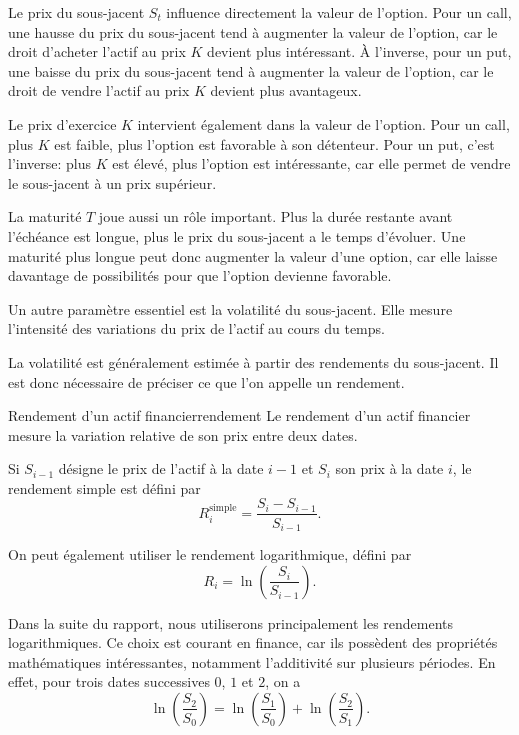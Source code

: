 \documentclass[11pt]{report}
\begin{document}
Le prix du sous-jacent $S_t$ influence directement la valeur de l'option. Pour un call, une hausse du prix du sous-jacent tend à augmenter la valeur de l'option, car le droit d'acheter l'actif au prix $K$ devient plus intéressant. À l'inverse, pour un put, une baisse du prix du sous-jacent tend à augmenter la valeur de l'option, car le droit de vendre l'actif au prix $K$ devient plus avantageux.

Le prix d'exercice $K$ intervient également dans la valeur de l'option. Pour un call, plus $K$ est faible, plus l'option est favorable à son détenteur. Pour un put, c'est l'inverse: plus $K$ est élevé, plus l'option est intéressante, car elle permet de vendre le sous-jacent à un prix supérieur.

La maturité $T$ joue aussi un rôle important. Plus la durée restante avant l'échéance est longue, plus le prix du sous-jacent a le temps d'évoluer. Une maturité plus longue peut donc augmenter la valeur d'une option, car elle laisse davantage de possibilités pour que l'option devienne favorable.

Un autre paramètre essentiel est la volatilité du sous-jacent. Elle mesure l'intensité des variations du prix de l'actif au cours du temps.

La volatilité est généralement estimée à partir des rendements du sous-jacent. Il est donc nécessaire de préciser ce que l'on appelle un rendement.

\begin{definition}{Rendement d'un actif financier}{rendement}
Le rendement d'un actif financier mesure la variation relative de son prix entre deux dates.

Si $S_{i-1}$ désigne le prix de l'actif à la date $i-1$ et $S_i$ son prix à la date $i$, le rendement simple est défini par
\[
R_i^{\mathrm{simple}} = \frac{S_i - S_{i-1}}{S_{i-1}}.
\]

On peut également utiliser le rendement logarithmique, défini par
\[
R_i = \ln\left(\frac{S_i}{S_{i-1}}\right).
\]
\end{definition}

Dans la suite du rapport, nous utiliserons principalement les rendements logarithmiques. Ce choix est courant en finance, car ils possèdent des propriétés mathématiques intéressantes, notamment l'additivité sur plusieurs périodes. En effet, pour trois dates successives $0$, $1$ et $2$, on a
\[
\ln\left(\frac{S_2}{S_0}\right)
=
\ln\left(\frac{S_1}{S_0}\right)
+
\ln\left(\frac{S_2}{S_1}\right).
\]
\end{document}
